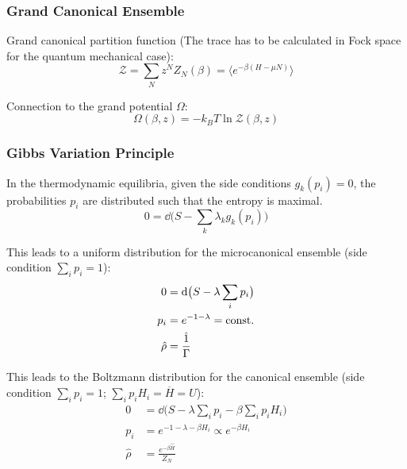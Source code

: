 		\subsubsection{Grand Canonical Ensemble}
			\noindent
			Grand canonical partition function (The trace has to be calculated in Fock space for the quantum mechanical case):
			\begin{equation}
				\mathcal{Z} = \sum_N z^N Z_N(\beta) = \langle e^{-\beta(H-\mu N)} \rangle
			\end{equation}

			\noindent
			Connection to the grand potential $\Omega$:
			\begin{equation}
				\Omega(\beta,z) = -k_B T \ln \mathcal{Z}(\beta,z)
			\end{equation}


		\subsubsection{Gibbs Variation Principle}
			\noindent
			In the thermodynamic equilibria, given the side conditions $g_k(p_i) = 0$, the probabilities $p_i$ are distributed such that the entropy is maximal.
			\begin{equation}
				0 = \dd \big( S - \sum_k \lambda_k g_k(p_i) \big)
			\end{equation}

			\noindent
			This leads to a uniform distribution for the microcanonical ensemble (side condition $\sum_i p_i = 1$):
			\begin{equation}
				\begin{aligned}
					0 &= \dd \big( S - \lambda \sum_i p_i \big) \\
					p_i &= e^{-1-\lambda} = \const \\
					\hat{\rho} &= \frac{\hat{1}}{\Gamma} \\ %
				\end{aligned}
			\end{equation}

			\noindent
			This leads to the Boltzmann distribution for the canonical ensemble (side condition $\sum_i p_i = 1$; $\sum_i p_i H_i = \overline{H} = U$):
			\begin{equation}
				\begin{aligned}
					0 &= \dd \big( S - \lambda \sum_i p_i - \beta \sum_i p_i H_i \big) \\
					p_i &= e^{-1-\lambda-\beta H_i} \propto e^{-\beta H_i} \\
					\hat{\rho} &= \frac{e^{-\beta \hat{H}}}{Z_N} \\
				\end{aligned}
			\end{equation}

